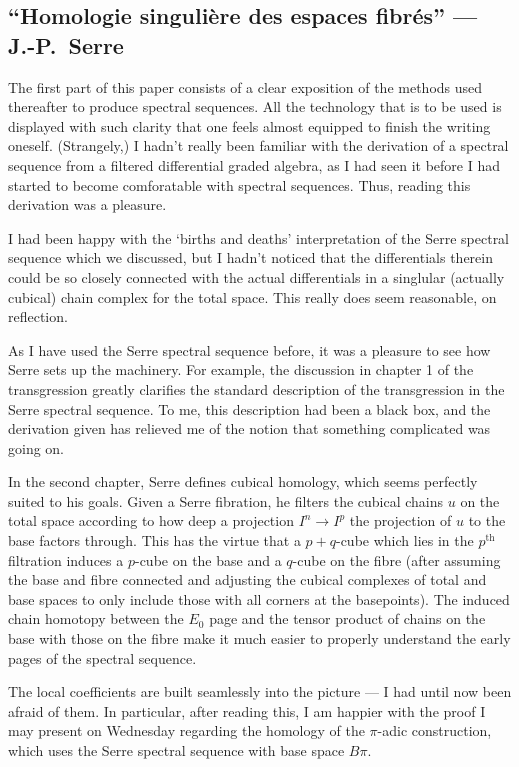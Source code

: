 \documentclass[11pt]{article}
\newcommand{\KanSemResponse}[1]
{
\thispagestyle{fancy}
\subsection*{#1}
}
\begin{document}
\begin{SerreHomSingFibSpace}
\KanSemResponse
{``Homologie singuli\`ere des espaces fibr\'es'' --- J.-P.\ Serre}
The first part of this paper consists of a clear exposition of the methods used thereafter to produce spectral sequences. All the technology that is to be used is displayed with such clarity that one feels almost equipped to finish the writing oneself. (Strangely,) I hadn't really been familiar with the derivation of a spectral sequence from a filtered differential graded algebra, as I had seen it before I had started to become comforatable with spectral sequences. Thus, reading this derivation was a pleasure.

I had been happy with the `births and deaths' interpretation of the Serre spectral sequence which we discussed, but I hadn't noticed that the differentials therein could be so closely connected with the actual differentials in a singlular (actually cubical) chain complex for the total space. This really does seem reasonable, on reflection.

As I have used the Serre spectral sequence before, it was a pleasure to see how Serre sets up the machinery. For example, the discussion in chapter 1 of the transgression greatly clarifies the standard description of the transgression in the Serre spectral sequence. To me, this description had been a black box, and the derivation given has relieved me of the notion that something complicated was going on.

In the second chapter, Serre defines cubical homology, which seems perfectly suited to his goals. Given a Serre fibration, he filters the cubical chains $u$ on the total space according to how deep a projection $I^n\to I^p$ the projection of $u$ to the base factors through. This has the virtue that a $p+q$-cube which lies in the $p^\text{th}$ filtration induces a $p$-cube on the base and a $q$-cube on the fibre (after assuming the base and fibre connected and adjusting the cubical complexes of total and base spaces to only include those with all corners at the basepoints). The induced chain homotopy between the $E_0$ page and the tensor product of chains on the base with those on the fibre make it much easier to properly understand the early pages of the spectral sequence.

The local coefficients are built seamlessly into the picture --- I had until now been afraid of them. In particular, after reading this, I am happier with the proof I may present on Wednesday regarding the homology of the $\pi$-adic construction, which uses the Serre spectral sequence with base space $B\pi$.


\end{SerreHomSingFibSpace}
\end{document}
